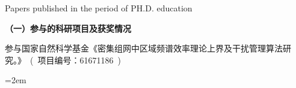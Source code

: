 
{} {Papers
published in the period of PH.D. education}
\setlength{\parindent}{0em}

\textbf{（一）参与的科研项目及获奖情况}
\begin{publist}
\item 参与国家自然科学基金《密集组网中区域频谱效率理论上界及干扰管理算法研究。》~(~项目编号：61671186~)
\end{publist}
\vfill
{}\hangindent=2em\noindent

\setlength{\parindent}{2em}

